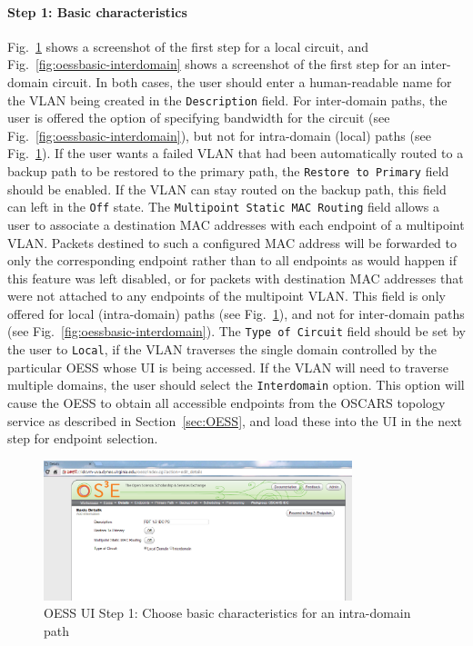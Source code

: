 \paragraph{Step 1:  Basic characteristics}
Fig.~\ref{fig:oessbasic} shows a screenshot of the first step for a local circuit, and Fig.~\ref{fig:oessbasic-interdomain} shows a screenshot of the first step for an inter-domain circuit.
In both cases, the user should enter a human-readable name for the VLAN being created in the
\texttt{Description} field. For inter-domain paths, the user is offered the option of specifying
bandwidth for the circuit (see Fig.~\ref{fig:oessbasic-interdomain}), but not for intra-domain (local) paths (see Fig.~\ref{fig:oessbasic}).
 If the user wants a failed VLAN that had been automatically routed to a backup path to be restored to the primary path, the \texttt{Restore to Primary} field should be enabled. If the VLAN can stay routed on the backup path, this field can left in the \texttt{Off} state. The \texttt{Multipoint Static MAC Routing} field allows a user to associate a destination MAC addresses with each endpoint of a multipoint VLAN. Packets destined to such a configured MAC address will be forwarded to only the corresponding endpoint rather than to all endpoints as would happen if this feature was left disabled, or for packets with destination MAC addresses that were not attached to any endpoints of the multipoint VLAN.
 This field is only offered for local (intra-domain) paths (see Fig.~\ref{fig:oessbasic}), and
 not for inter-domain paths (see Fig.~\ref{fig:oessbasic-interdomain}). The \texttt{Type of Circuit} field should be set by the user to \texttt{Local}, if the VLAN traverses the single domain controlled by the particular OESS whose UI is being accessed. If the VLAN will
need to traverse multiple domains, the user should select the \texttt{Interdomain} option. This
option will cause the OESS to obtain all accessible endpoints from the
OSCARS topology service as described in Section~\ref{sec:OESS}, and load these into the UI in the next step for endpoint selection.

\begin{figure}[htb!]
\centering
\includegraphics[width=0.8\textwidth]{figures/oess-basic.png}
\caption{OESS UI Step 1: Choose basic characteristics for an intra-domain path}
\label{fig:oessbasic}
\end{figure}


